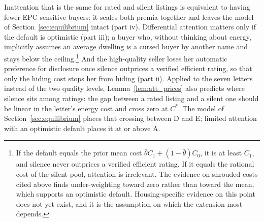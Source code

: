 Inattention that is the same for rated and silent listings is equivalent to having fewer EPC-sensitive buyers: it scales both premia together and leaves the model of Section~\ref{sec:equilibrium} intact (part iv). Differential attention matters only if the default is optimistic (part iii); a buyer who, without thinking about energy, implicitly assumes an average dwelling is a cursed buyer by another name and stays below the ceiling.\footnote{If the default equals the prior mean cost $\bar\theta C_1+(1-\bar\theta)C_0$, it is at least $C_1$, and silence never outprices a verified efficient rating. If it equals the rational cost of the silent pool, attention is irrelevant. The evidence on shrouded costs cited above finds under-weighting toward zero rather than toward the mean, which supports an optimistic default. Housing-specific evidence on this point does not yet exist, and it is the assumption on which the extension most depends.} And the high-quality seller loses her automatic preference for disclosure once silence outprices a verified efficient rating, so that only the hiding cost stops her from hiding (part ii). Applied to the seven letters instead of the two quality levels, Lemma~\ref{lem:att_prices} also predicts where silence sits among ratings: the gap between a rated listing and a silent one should be linear in the letter's energy cost and cross zero at $C^*$. The model of Section~\ref{sec:equilibrium} places that crossing between D and E; limited attention with an optimistic default places it at or above A.
